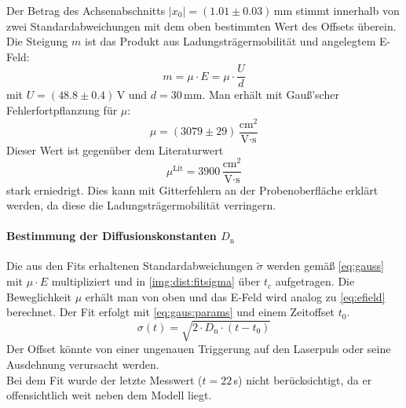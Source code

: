 Der Betrag des Achsenabschnitts $|x_0| = (1.01 \pm 0.03)$\,mm stimmt innerhalb von zwei Standardabweichungen mit dem oben bestimmten Wert des 
Offsets überein.\\
Die Steigung $m$ ist das Produkt aus Ladungsträgermobilität und angelegtem E-Feld:
\begin{equation}
  \label{eq:efield}
  m = \mu \cdot E = \mu \cdot \frac{U}{d}
\end{equation}
mit $U = (48.8 \pm 0.4)$\,V und $d=30$\,mm. Man erhält mit Gauß'scher Fehlerfortpflanzung für $\mu$:
\begin{equation}
  \mu = (3079 \pm 29)\,\frac{\text{cm}^2}{\text{V} \cdot \text{s}}
\end{equation}
Dieser Wert ist gegenüber dem Literaturwert
\begin{equation}
  \mu^{\text{Lit}} = 3900\,\frac{\text{cm}^2}{\text{V} \cdot \text{s}}
\end{equation}
stark erniedrigt. Dies kann mit Gitterfehlern an der Probenoberfläche erklärt werden, da diese die Ladungsträgermobilität verringern.

\paragraph{Bestimmung der Diffusionskonstanten $D_\text{n}$}
Die aus den Fits erhaltenen Standardabweichungen $\tilde{\sigma}$ werden gemäß \autoref{eq:gauss} mit $\mu \cdot E$ multipliziert und 
in \autoref{img:dist:fitsigma} über $t_c$ aufgetragen. Die Beweglichkeit $\mu$ erhält man von oben und das E-Feld wird analog zu \autoref{eq:efield} berechnet.
Der Fit erfolgt mit \autoref{eq:gaus:params} und einem Zeitoffset $t_0$.
\begin{equation}
  \sigma(t) = \sqrt{2 \cdot D_\text{n} \cdot (t-t_0)}
\end{equation}
Der Offset könnte von einer ungenauen Triggerung auf den Laserpuls oder seine Ausdehnung verursacht werden. \\
Bei dem Fit wurde der letzte Messwert ($t=22$\,\textmu s) nicht berücksichtigt, da er offensichtlich weit neben dem Modell liegt.


